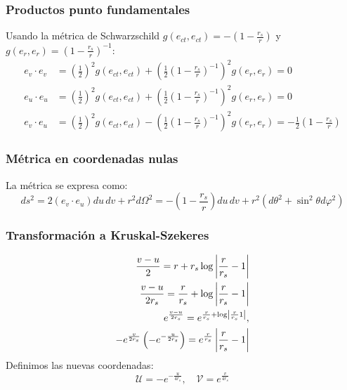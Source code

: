 \subsubsection{Productos punto fundamentales}
Usando la métrica de Schwarzschild \( g(e_{ct},e_{ct}) = -\left(1-\frac{r_s}{r}\right) \) y \( g(e_r,e_r) = \left(1-\frac{r_s}{r}\right)^{-1} \):
\begin{equation}
    \begin{aligned}
        e_v \cdot e_v & = \left(\frac{1}{2}\right)^2 g(e_{ct},e_{ct}) + \left(\frac{1}{2}\left(1-\frac{r_s}{r}\right)^{-1}\right)^2 g(e_r,e_r) = 0                                        \\
        e_u \cdot e_u & = \left(\frac{1}{2}\right)^2 g(e_{ct},e_{ct}) + \left(\frac{1}{2}\left(1-\frac{r_s}{r}\right)^{-1}\right)^2 g(e_r,e_r) = 0                                        \\
        e_v \cdot e_u & = \left(\frac{1}{2}\right)^2 g(e_{ct},e_{ct}) - \left(\frac{1}{2}\left(1-\frac{r_s}{r}\right)^{-1}\right)^2 g(e_r,e_r) = -\frac{1}{2}\left(1-\frac{r_s}{r}\right)
    \end{aligned}
\end{equation}

\subsubsection{Métrica en coordenadas nulas}
La métrica se expresa como:
\begin{equation}
    ds^2 = 2(e_v \cdot e_u) du\, dv + r^2 d\Omega^2 = -\left(1-\frac{r_s}{r}\right) du\, dv + r^2(d\theta^2 + \sin^2\theta d\varphi^2)
\end{equation}

\subsubsection{Transformación a Kruskal-Szekeres}

\begin{equation}
    \begin{aligned}
        \frac{v-u}{2}=r+r_s \log \left|\frac{r}{r_s}-1\right|                 \\
        \frac{v-u}{2 r_s}=\frac{r}{r_s}+\log \left|\frac{r}{r_s}-1\right|     \\
        e^{\frac{v-u}{2 r_s}}=e^{\frac{r}{r_s}+\log \left|  \frac{r}{r_s} 1 \right| }, \\
        -e^{\frac{v}{2 r_s}}\left(-e^{-\frac{u}{2 r_s}}\right)=e^{\frac{r}{r_s}}\left|\frac{r}{r_s}-1\right|
    \end{aligned}
\end{equation}
Definimos las nuevas coordenadas:
\begin{equation}
    \mathcal{U} = -e^{-\frac{u}{4r_s}}, \quad \mathcal{V} = e^{\frac{v}{4r_s}}
\end{equation}

